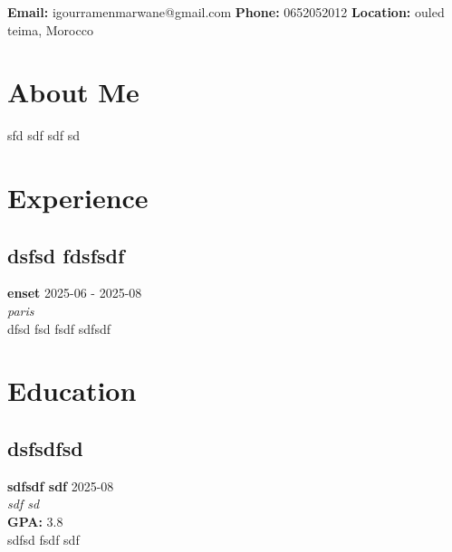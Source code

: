 \documentclass[11pt,a4paper]{article}
\begin{document}
\begin{center}
\end{center}

\vspace{1em}

\begin{center}
\textbf{Email:} igourramenmarwane@gmail.com \quad
\textbf{Phone:} 0652052012 \quad
\textbf{Location:} ouled teima, Morocco\\



\end{center}


\section{About Me}
sfd sdf sdf sd



\section{Experience}

\subsection{dsfsd fdsfsdf }
\textcolor{primary}{\textbf{enset}} \hfill \textcolor{secondary}{2025-06 - 2025-08}\\
\textit{paris}\\
dfsd fsd fsdf sdfsdf \\




\section{Education}

\subsection{dsfsdfsd}
\textcolor{primary}{\textbf{sdfsdf sdf}} \hfill \textcolor{secondary}{2025-08}\\
\textit{sdf sd}\\
\textbf{GPA:} 3.8\\
sdfsd fsdf sdf \\
\end{document}
